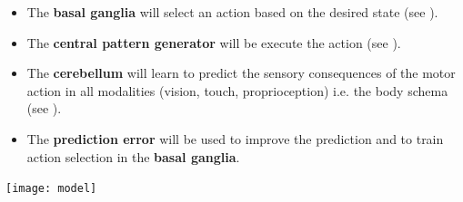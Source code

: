 \documentclass[portrait,final,a0paper,fontscale=0.31]{baposter}
\begin{document}
\begin{poster}
{\begin{adjustbox}{minipage=0.95\textwidth, margin=5pt, center}
	\begin{minipage}[r]{0.6\textwidth}
		\begin{itemize}
		\item The \textbf{basal ganglia} will select an action based on the desired state (see \cite{baladronHabitLearningHierarchical2020}).
		\item The \textbf{central pattern generator} will be execute the action (see \cite{nassourConcreteActionRepresentation2020}).
		\item The \textbf{cerebellum} will learn to predict the sensory consequences of the motor action in all modalities (vision, touch, proprioception) i.e. the body schema (see \cite{schmidForwardModelsCerebellum2019}). 
		\item The \textbf{prediction error} will be used to improve the prediction and to train action selection in the \textbf{basal ganglia}.
		\end{itemize}
	\end{minipage}
	\begin{minipage}[r]{0.1\textwidth}
	\end{minipage}
	\begin{minipage}[l]{0.4\textwidth}
		\raggedleft
		\texttt{[image: model]}
	\end{minipage}
	\end{adjustbox}
	
	\vspace{0.3em}
}



\end{poster}
\end{document}
